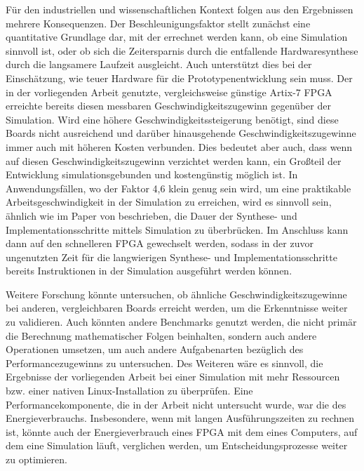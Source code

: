    Für den industriellen und wissenschaftlichen Kontext folgen aus den Ergebnissen mehrere Konsequenzen.
    Der Beschleunigungsfaktor stellt zunächst eine quantitative Grundlage dar, mit der errechnet werden kann, ob eine Simulation sinnvoll ist, oder ob sich die Zeitersparnis durch die entfallende Hardwaresynthese durch die langsamere Laufzeit ausgleicht.
    Auch unterstützt dies bei der Einschätzung, wie teuer Hardware für die Prototypenentwicklung sein muss.
    Der in der vorliegenden Arbeit genutzte, vergleichsweise günstige Artix-7 FPGA erreichte bereits diesen messbaren Geschwindigkeitszugewinn gegenüber der Simulation.
    Wird eine höhere Geschwindigkeitssteigerung benötigt, sind diese Boards nicht ausreichend und darüber hinausgehende Geschwindigkeitszugewinne immer auch mit höheren Kosten verbunden.
    Dies bedeutet aber auch, dass wenn auf diesen Geschwindigkeitszugewinn verzichtet werden kann, ein Großteil der Entwicklung simulationsgebunden und kostengünstig möglich ist.
    In Anwendungsfällen, wo der Faktor 4,6 klein genug sein wird, um eine praktikable Arbeitsgeschwindigkeit in der Simulation zu erreichen, wird es sinnvoll sein, ähnlich wie im Paper von \textcite{schkufza2019just} beschrieben, die Dauer der Synthese- und Implementationsschritte mittels Simulation zu überbrücken.
    Im Anschluss kann dann auf den schnelleren FPGA gewechselt werden, sodass in der zuvor ungenutzten Zeit für die langwierigen Synthese- und Implementationsschritte bereits Instruktionen in der Simulation ausgeführt werden können.

    Weitere Forschung könnte untersuchen, ob ähnliche Geschwindigkeitszugewinne bei anderen, vergleichbaren Boards erreicht werden, um die Erkenntnisse weiter zu validieren.
    Auch könnten andere Benchmarks genutzt werden, die nicht primär die Berechnung mathematischer Folgen beinhalten, sondern auch andere Operationen umsetzen, um auch andere Aufgabenarten bezüglich des Performancezugewinns zu untersuchen.
    Des Weiteren wäre es sinnvoll, die Ergebnisse der vorliegenden Arbeit bei einer Simulation mit mehr Ressourcen bzw. einer nativen Linux-Installation zu überprüfen.
    Eine Performancekomponente, die in der Arbeit nicht untersucht wurde, war die des Energieverbrauchs.
    Insbesondere, wenn mit langen Ausführungszeiten zu rechnen ist, könnte auch der Energieverbrauch eines FPGA mit dem eines Computers, auf dem eine Simulation läuft, verglichen werden, um Entscheidungsprozesse weiter zu optimieren.